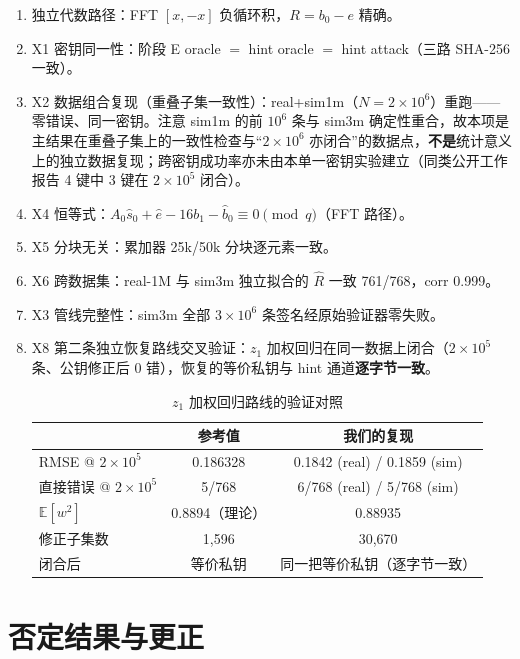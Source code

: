 \documentclass[11pt,a4paper]{ctexart}
\newcommand{\modq}{\pmod q}
\begin{document}
\begin{enumerate}
\item 独立代数路径：FFT $[x,-x]$ 负循环积，$R=b_0-e$ 精确。
\item X1 密钥同一性：阶段 E oracle $=$ hint oracle $=$ hint attack（三路 SHA-256 一致）。
\item X2 数据组合复现（重叠子集一致性）：real+sim1m（$N=2\times10^6$）重跑——零错误、同一密钥。注意 sim1m 的前 $10^6$ 条与 sim3m 确定性重合，故本项是主结果在重叠子集上的一致性检查与“$2\times10^6$ 亦闭合”的数据点，\textbf{不是}统计意义上的独立数据复现；跨密钥成功率亦未由本单一密钥实验建立（同类公开工作报告 4 键中 3 键在 $2\times10^5$ 闭合）。
\item X4 恒等式：$A_0\hat s_0+\hat e-16b_1-\hat b_0\equiv0\modq$（FFT 路径）。
\item X5 分块无关：累加器 25k/50k 分块逐元素一致。
\item X6 跨数据集：real-1M 与 sim3m 独立拟合的 $\hat R$ 一致 761/768，corr 0.999。
\item X3 管线完整性：sim3m 全部 $3\times10^6$ 条签名经原始验证器零失败。
\item X8 第二条独立恢复路线交叉验证：$z_1$ 加权回归在同一数据上闭合（$2\times10^5$ 条、公钥修正后 0 错），恢复的等价私钥与 hint 通道\textbf{逐字节一致}。

\begin{table}[htbp]
\centering\small
\caption{$z_1$ 加权回归路线的验证对照}\label{tab:repro}
\begin{tabular}{lcc}
\toprule
 & 参考值 & 我们的复现 \\
\midrule
RMSE @ $2\times10^5$ & 0.186328 & 0.1842 (real) / 0.1859 (sim) \\
直接错误 @ $2\times10^5$ & 5/768 & 6/768 (real) / 5/768 (sim) \\
$\mathbb{E}[w^2]$ & 0.8894（理论） & 0.88935 \\
修正子集数 & 1,596 & 30,670 \\
闭合后 & 等价私钥 & 同一把等价私钥（逐字节一致） \\
\bottomrule
\end{tabular}
\end{table}
\end{enumerate}

\section{否定结果与更正}\label{sec:negative}
\end{document}
